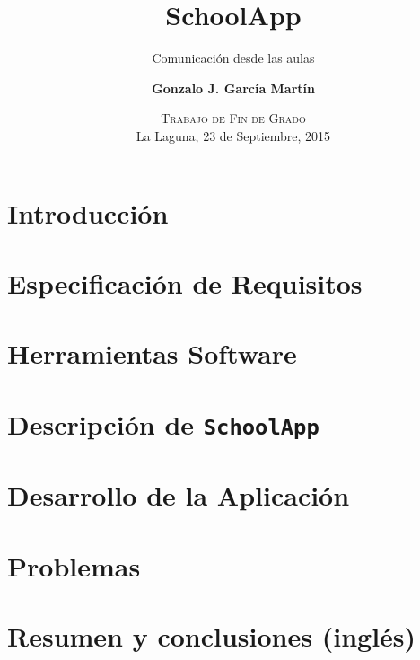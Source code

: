 \documentclass[blue,uncompressed]{beamer}
\title{\textbf{SchoolApp}}
\subtitle{Comunicación desde las aulas}
\author[Gonzalo J. García Martín]
{
	\textbf{Gonzalo J. García Martín}
}
\institute[ULL]
\date[Trabajo de Fin de Grado]{\textsc{Trabajo de Fin de Grado}     \\
                           La Laguna, 23 de Septiembre, 2015}
\newcommand{\SchollApp}{\texttt{SchoolApp{}}}
\begin{document}
	\begin{frame}[plain]
	\titlepage
	\end{frame}

		\section{Introducción}
			
		\section{Especificación de Requisitos}
			
		\section{Herramientas Software}
			
		\section{Descripción de \SchollApp}
			
		\section{Desarrollo de la Aplicación}
			
		\section{Problemas}
			
		\section{Resumen y conclusiones (inglés)}
			
		
\end{document}

